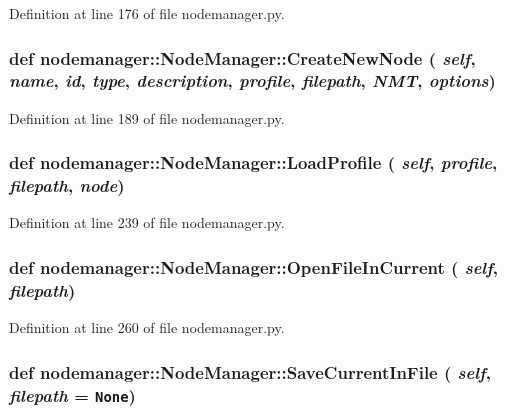 Definition at line 176 of file nodemanager.py.\hypertarget{classnodemanager_1_1NodeManager_12653bdbfbf0d1a4749dd5f635a5c312}{
\subsubsection[CreateNewNode]{\setlength{\rightskip}{0pt plus 5cm}def nodemanager::Node\-Manager::Create\-New\-Node ( {\em self},  {\em name},  {\em id},  {\em type},  {\em description},  {\em profile},  {\em filepath},  {\em NMT},  {\em options})}}
\label{classnodemanager_1_1NodeManager_12653bdbfbf0d1a4749dd5f635a5c312}




Definition at line 189 of file nodemanager.py.\hypertarget{classnodemanager_1_1NodeManager_091f8f1baf230f40550d0bc5f8982258}{
\subsubsection[LoadProfile]{\setlength{\rightskip}{0pt plus 5cm}def nodemanager::Node\-Manager::Load\-Profile ( {\em self},  {\em profile},  {\em filepath},  {\em node})}}
\label{classnodemanager_1_1NodeManager_091f8f1baf230f40550d0bc5f8982258}




Definition at line 239 of file nodemanager.py.\hypertarget{classnodemanager_1_1NodeManager_274b68764a3878f456f3f8753bb6cf87}{
\subsubsection[OpenFileInCurrent]{\setlength{\rightskip}{0pt plus 5cm}def nodemanager::Node\-Manager::Open\-File\-In\-Current ( {\em self},  {\em filepath})}}
\label{classnodemanager_1_1NodeManager_274b68764a3878f456f3f8753bb6cf87}




Definition at line 260 of file nodemanager.py.\hypertarget{classnodemanager_1_1NodeManager_42b9672fcec8be9ab909f5d94de0c06a}{
\subsubsection[SaveCurrentInFile]{\setlength{\rightskip}{0pt plus 5cm}def nodemanager::Node\-Manager::Save\-Current\-In\-File ( {\em self},  {\em filepath} = {\tt None})}}
\label{classnodemanager_1_1NodeManager_42b9672fcec8be9ab909f5d94de0c06a}




